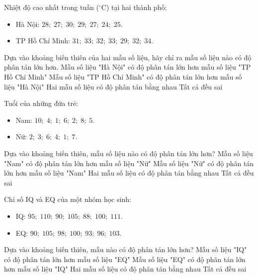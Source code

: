 \begin{ex}
	Nhiệt độ cao nhất trong tuần ($^\circ\text{C}$) tại hai thành phố:
	\begin{itemize}
		\item Hà Nội: $28;\; 27;\; 30;\; 29;\; 27;\; 24;\; 25$.
		\item TP Hồ Chí Minh: $31;\; 33;\; 32;\; 33;\; 29;\; 32;\; 34$.
	\end{itemize}
	Dựa vào khoảng biến thiên của hai mẫu số liệu, hãy chỉ ra mẫu số liệu nào có độ phân tán lớn hơn.
	\choice
	{\True Mẫu số liệu "Hà Nội" có độ phân tán lớn hơn mẫu số liệu "TP Hồ Chí Minh"}
	{Mẫu số liệu "TP Hồ Chí Minh" có độ phân tán lớn hơn mẫu số liệu "Hà Nội"}
	{Hai mẫu số liệu có độ phân tán bằng nhau}
	{Tất cả đều sai}
\end{ex}

\begin{ex}
	Tuổi của những đứa trẻ:
	\begin{itemize}
		\item Nam: $10;\; 4;\; 1;\; 6;\; 2;\; 8;\; 5$.
		\item Nữ: $2;\; 3;\; 6;\; 4;\; 1;\; 7$.
	\end{itemize}
	Dựa vào khoảng biến thiên, mẫu số liệu nào có độ phân tán lớn hơn?
	\choice
	{\True Mẫu số liệu "Nam" có độ phân tán lớn hơn mẫu số liệu "Nữ"}
	{Mẫu số liệu "Nữ" có độ phân tán lớn hơn mẫu số liệu "Nam"}
	{Hai mẫu số liệu có độ phân tán bằng nhau}
	{Tất cả đều sai}
\end{ex}

\begin{ex}
	Chỉ số IQ và EQ của một nhóm học sinh:
	\begin{itemize}
		\item IQ: $95;\; 110;\; 90;\; 105;\; 88;\; 100;\; 111$.
		\item EQ: $90;\; 105;\; 98;\; 100;\; 93;\; 96;\; 103$.
	\end{itemize}
	Dựa vào khoảng biến thiên, mẫu nào có độ phân tán lớn hơn?
	\choice
	{\True Mẫu số liệu "IQ" có độ phân tán lớn hơn mẫu số liệu "EQ"}
	{Mẫu số liệu "EQ" có độ phân tán lớn hơn mẫu số liệu "IQ"}
	{Hai mẫu số liệu có độ phân tán bằng nhau}
	{Tất cả đều sai}
\end{ex}


